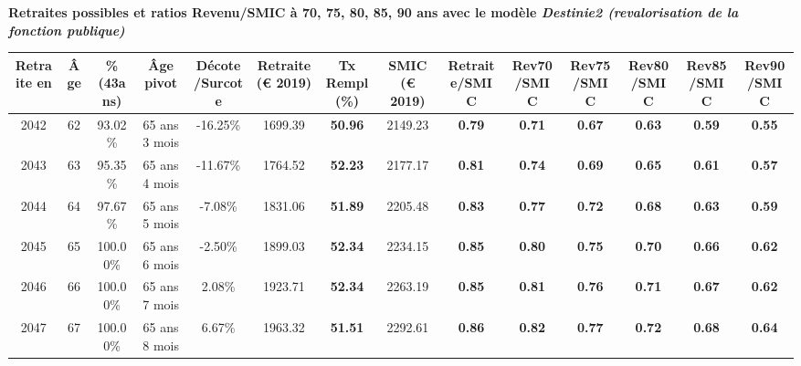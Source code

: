  \vspace{0.1cm} 
{\bf \noindent Retraites possibles et ratios Revenu/SMIC à 70, 75, 80, 85, 90 ans avec le modèle \emph{Destinie2 (revalorisation de la fonction publique)}}  
 
\begin{adjustbox}{max width=\textwidth} 
\begin{tabular}[htb]{|c|c||c|c|c||c|c||c||c|c|c|c|c|c|} 
\hline 
 Retraite en &  Âge &  \%(43ans) &  Âge pivot &  Décote/Surcote &  Retraite (\euro{} 2019) &  Tx Rempl(\%) &  SMIC (\euro{} 2019) &  Retraite/SMIC &  Rev70/SMIC &  Rev75/SMIC &  Rev80/SMIC &  Rev85/SMIC &  Rev90/SMIC \\ 
\hline \hline 
 2042 &  62 &  93.02\% &  65 ans 3 mois &  -16.25\% &  1699.39 &  {\bf 50.96} &  2149.23 &  {\bf {\color{red} 0.79}} &  {\bf {\color{red} 0.71}} &  {\bf {\color{red} 0.67}} &  {\bf {\color{red} 0.63}} &  {\bf {\color{red} 0.59}} &  {\bf {\color{red} 0.55}} \\ 
\hline 
 2043 &  63 &  95.35\% &  65 ans 4 mois &  -11.67\% &  1764.52 &  {\bf 52.23} &  2177.17 &  {\bf {\color{red} 0.81}} &  {\bf {\color{red} 0.74}} &  {\bf {\color{red} 0.69}} &  {\bf {\color{red} 0.65}} &  {\bf {\color{red} 0.61}} &  {\bf {\color{red} 0.57}} \\ 
\hline 
 2044 &  64 &  97.67\% &  65 ans 5 mois &  -7.08\% &  1831.06 &  {\bf 51.89} &  2205.48 &  {\bf {\color{red} 0.83}} &  {\bf {\color{red} 0.77}} &  {\bf {\color{red} 0.72}} &  {\bf {\color{red} 0.68}} &  {\bf {\color{red} 0.63}} &  {\bf {\color{red} 0.59}} \\ 
\hline 
 2045 &  65 &  100.00\% &  65 ans 6 mois &  -2.50\% &  1899.03 &  {\bf 52.34} &  2234.15 &  {\bf {\color{red} 0.85}} &  {\bf {\color{red} 0.80}} &  {\bf {\color{red} 0.75}} &  {\bf {\color{red} 0.70}} &  {\bf {\color{red} 0.66}} &  {\bf {\color{red} 0.62}} \\ 
\hline 
 2046 &  66 &  100.00\% &  65 ans 7 mois &  2.08\% &  1923.71 &  {\bf 52.34} &  2263.19 &  {\bf {\color{red} 0.85}} &  {\bf {\color{red} 0.81}} &  {\bf {\color{red} 0.76}} &  {\bf {\color{red} 0.71}} &  {\bf {\color{red} 0.67}} &  {\bf {\color{red} 0.62}} \\ 
\hline 
 2047 &  67 &  100.00\% &  65 ans 8 mois &  6.67\% &  1963.32 &  {\bf 51.51} &  2292.61 &  {\bf {\color{red} 0.86}} &  {\bf {\color{red} 0.82}} &  {\bf {\color{red} 0.77}} &  {\bf {\color{red} 0.72}} &  {\bf {\color{red} 0.68}} &  {\bf {\color{red} 0.64}} \\ 
\hline 
\hline 
\end{tabular} 
\end{adjustbox} 
 
